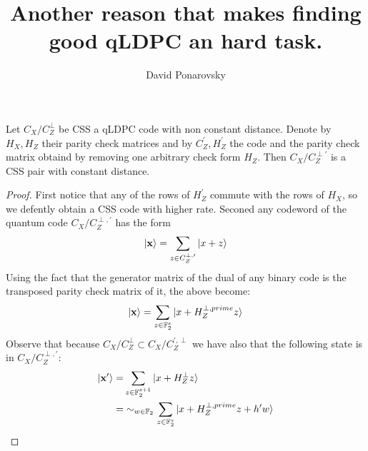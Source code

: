 \documentclass[manuscript,screen,review]{acmart}
\begin{document}


\title{Another reason that makes finding good qLDPC an hard task.} 
\author{David Ponarovsky}
  \maketitle
  
  \begin{claim}
    Let $C_{X}/C_{Z}^{\perp}$ be CSS a qLDPC code with non constant distance. Denote by $H_{X},H_{Z}$ their parity check matrices and by $C_{Z}^{\prime},H_{Z}^{\prime}$ the code and the parity check matrix obtaind by removing one arbitrary check form $H_{Z}$. Then $C_{X}/C_{Z}^{\perp \prime}$ is a CSS pair with constant distance.    
  \end{claim}
  \begin{proof}
    First notice that any of the rows of $H_{Z}^{\prime}$ commute with the rows of $H_{X}$, so we defently obtain a CSS code with higher rate. Seconed any codeword of the quantum code $C_{X}/C_{Z}^{\perp, \prime}$ has the form  
    \begin{equation*}
      \begin{split}
        \ket{ \mathbf{x} } = \sum_{z \in C_{Z}^{\perp, \prime}}{\ket{ x + z}}
      \end{split}
    \end{equation*}
    Using the fact that the generator matrix of the dual of any binary code is the transposed parity check matrix of it, the above become:
\begin{equation*}
      \begin{split}
        \ket{ \mathbf{x} } = \sum_{z \in \mathbb{F}_{2}^{s}}{\ket{ x + H_{Z}^{\perp, prime} z}}
      \end{split}
    \end{equation*}
Observe that because $C_{X}/C_{Z}^{\perp} \subset  C_{X}/C_{Z}^{\prime, \perp}$ we have also that the following state is in $C_{X}/C_{Z}^{\perp, \prime}$:
\begin{equation*}
  \begin{split} 
    \ket{ \mathbf{x^{\prime}} } = & \sum_{z \in \mathbb{F}_{2}^{s+1}}{\ket{ x + H_{Z}^{\perp} z}} \\
      =&  \sim_{w \in \mathbb{F}_{2}}\sum_{z \in \mathbb{F}_{2}^{s}}{\ket{ x + H_{Z}^{\perp, prime} z + h^{\prime} w  }}
  \end{split}
\end{equation*}

\end{proof}
\end{document}
